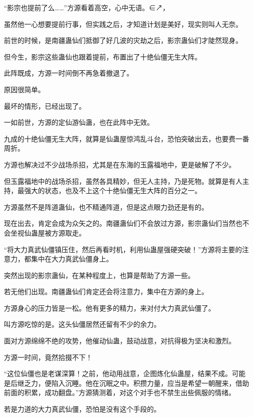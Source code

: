 
\begin{this_body}

“影宗也提前了么……”方源看着高空，心中无语。∈↗，

虽然他一心想要提前行事，但实践之后，才知道计划是美好，现实则叫人无奈。

前世的时候，是南疆蛊仙们抵御了好几波的灾劫之后，影宗蛊仙们才陡然现身。

但今生，影宗这些蛊仙也跟着提前，布置出了十绝仙僵无生大阵。

此阵既成，方源一时间倒不再急着撤退了。

原因很简单。

最坏的情形，已经出现了。

一如前世，方源的定仙游仙蛊，也在此阵中无效。

九成的十绝仙僵无生大阵，就算是仙蛊屋惊鸿乱斗台，恐怕突破出去，也要费一番周折。

方源也解决过不少战场杀招，尤其是在东海的玉露福地中，更是破解了不少。

但玉露福地中的战场杀招，虽然各具精妙，但无人主持，乃是死物。就算是有人主持，最强大的状态，也及不上这个十绝仙僵无生大阵的百分之一。

方源虽然不是阵道蛊仙，也不精通阵道，但是这点眼力劲还是有的。

现在出去，肯定会成为众矢之的。南疆蛊仙们不会放过方源，影宗蛊仙们当然也不会坐视仙蛊屋被方源取走。

“将大力真武仙僵镇压住，然后再看时机，利用仙蛊屋强硬突破！”方源将主要的注意力，都集中在大力真武仙僵身上。

突然出现的影宗蛊仙，在某种程度上，也算是帮助了方源一些。

若无他们出现。南疆蛊仙们肯定还会将注意力，集中在方源的身上。

方源身心的压力皆是一松。他有更多的精力，来对付大力真武仙僵了。

叫方源吃惊的是。这头仙僵居然还留有不少的余力。

面对方源绵绵不绝的攻势，他催动仙蛊，鼓动战意，对抗得极为坚决和激烈。

方源一时间，竟然拾掇不下！

“这位仙僵也是老谋深算！之前，他动用战意，企图炼化仙蛊屋，结果不成。可能是后继乏力，便陷入沉睡。他在沉眠之中。积攒力量，应当是希望一朝醒来，借助前面的积累，成功翻盘。”方源猜测着，对这个对手也不禁生出些佩服的情绪。

若是力道的大力真武仙僵，恐怕是没有这个手段的。


\end{this_body}
